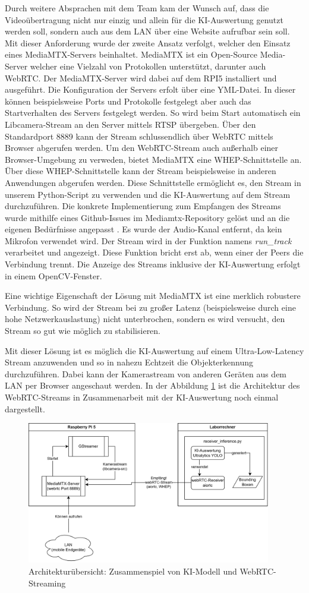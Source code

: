 Durch weitere Absprachen mit dem Team kam der Wunsch auf, dass die Videoübertragung nicht nur einzig und allein für die KI-Auswertung genutzt werden soll, sondern auch aus dem LAN über eine Website aufrufbar sein soll. Mit dieser Anforderung wurde der zweite Ansatz verfolgt, welcher den Einsatz eines MediaMTX-Servers beinhaltet. MediaMTX ist ein Open-Source Media-Server welcher eine Vielzahl von Protokollen unterstützt, darunter auch WebRTC. Der MediaMTX-Server wird dabei auf dem RPI5 installiert und ausgeführt. Die Konfiguration der Servers erfolt über eine YML-Datei.
In dieser können beispielsweise Ports und Protokolle festgelegt aber auch das Startverhalten des Servers festgelegt werden. So wird beim Start automatisch ein Libcamera-Stream an den Server mittels RTSP übergeben. Über den Standardport 8889 kann der Stream schlussendlich über WebRTC mittels Browser abgerufen werden. Um den WebRTC-Stream auch außerhalb einer Browser-Umgebung zu verweden, bietet MediaMTX eine WHEP-Schnittstelle an. Über diese WHEP-Schnittstelle kann der Stream beispielsweise in anderen Anwendungen abgerufen werden. Diese Schnittstelle ermöglicht es, den Stream in unserem Python-Script zu verwenden und die KI-Auswertung auf dem Stream durchzuführen. Die konkrete Implementierung zum Empfangen des Streams wurde mithilfe eines Github-Issues im Mediamtx-Repository gelöst und an die eigenen Bedürfnisse angepasst \cite{mediamtxwebrtc}. Es wurde der Audio-Kanal entfernt, da kein Mikrofon verwendet wird. Der Stream wird in der Funktion namens \textit{run\_track} verarbeitet und angezeigt. Diese Funktion bricht erst ab, wenn einer der Peers die Verbindung trennt. Die Anzeige des Streams inklusive der KI-Auswertung erfolgt in einem OpenCV-Fenster.

Eine wichtige Eigenschaft der Lösung mit MediaMTX ist eine merklich robustere Verbindung. So wird der Stream bei zu großer Latenz (beispielsweise durch eine hohe Netzwerkauslastung) nicht unterbrochen, sondern es wird versucht, den Stream so gut wie möglich zu stabilisieren. 

Mit dieser Lösung ist es möglich die KI-Auswertung auf einem Ultra-Low-Latency Stream anzuwenden und so in nahezu Echtzeit die Objekterkennung durchzuführen. Dabei kann der Kamerastream von anderen Geräten aus dem LAN per Browser angeschaut werden. In der Abbildung \ref{fig:KI-webRTC-Architektur} ist die Architektur des WebRTC-Streams in Zusammenarbeit mit der KI-Auswertung noch einmal dargestellt. 

\begin{figure}[H]
  \centering
  \includegraphics[width=0.95\textwidth]{images/ki-webrtc-arch.png}
  \caption{Architekturübersicht: Zusammenspiel von KI-Modell und WebRTC-Streaming}
  \label{fig:KI-webRTC-Architektur}
\end{figure}
